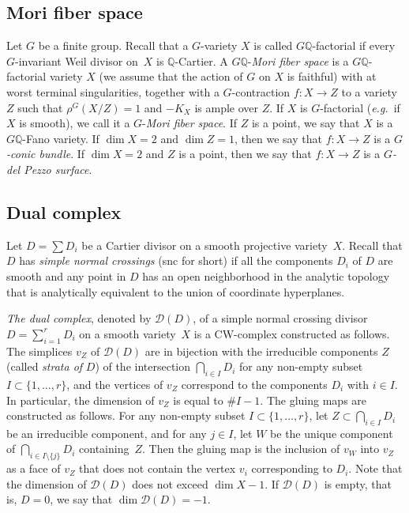 \documentclass[11pt]{amsart}
\numberwithin{equation}{section}
\theoremstyle{definition}
\theoremstyle{remark}
\begin{document}
\subsection{Mori fiber space}
\label{subsec-mfs}
Let $G$ be a finite group.  Recall that a $G$-variety $X$ is called $G\mathbb{Q}$-factorial if every $G$-invariant Weil divisor on~$X$ is $\mathbb{Q}$-Cartier.  A $G\mathbb{Q}$-\emph{Mori fiber space} is a $G\mathbb{Q}$-factorial variety $X$ (we assume that the action of $G$ on $X$ is faithful) with at worst terminal singularities, together with a $G$-contraction $f\colon X\to Z$ to a variety $Z$ such that $\rho^G(X/Z)=1$ and $-K_X$ is ample over $Z$. If $X$ is $G$-factorial (\textit{e.g.}~if $X$ is smooth), we call it a $G$-\emph{Mori fiber space}.  If $Z$ is a point, we say that $X$ is a $G\mathbb{Q}$-Fano variety.  If $\dim X=2$ and $\dim Z=1$, then we say that $f\colon X\to Z$ is a \emph{$G$-conic bundle}.  If $\dim X=2$ and $Z$ is a point, then we say that $f\colon X\to Z$ is a \emph{$G$-del Pezzo surface}.

\subsection{Dual complex}
\label{subsec-dual-complex}
Let $D=\sum D_i$ be a Cartier divisor on a smooth projective variety~$X$. Recall that $D$ has \emph{simple normal crossings} (snc for short) if all the components $D_i$ of $D$ are smooth and any point in $D$ has an open neighborhood in the analytic topology that is analytically equivalent to the union of coordinate hyperplanes.

\emph{The dual complex}, denoted by $\mathcal{D}(D)$, of a simple normal crossing divisor $D=\sum_{i=1}^{r} D_i$ on a smooth variety~$X$ is a CW-complex constructed as follows.  The simplices $v_Z$ of $\mathcal{D}(D)$ are in bijection with the  irreducible components $Z$ (called \emph{strata of} $D$) of the intersection $\bigcap_{i\in I} D_i$ for any non-empty subset $I\subset \{ 1, \ldots, r\}$, and the vertices of $v_Z$ correspond to the components $D_i$ with $i\in I$.  In particular, the dimension of $v_Z$ is equal to $\#I-1$.  The gluing maps are constructed as follows.  For any non-empty subset $I\subset \{ 1, \ldots, r\}$, let $Z\subset \bigcap_{i\in I} D_i$ be an irreducible component, and for any $j\in I$, let $W$ be the unique component of $\bigcap_{i\in I\setminus\{j\}} D_i$ containing~$Z$. Then the gluing map is the inclusion of $v_W$ into $v_Z$ as a face of $v_Z$ that does not contain the vertex $v_i$ corresponding to $D_i$. Note that the dimension of $\mathcal{D}(D)$ does not exceed $\dim X-1$. If $\mathcal{D}(D)$ is empty, that is, $D=0$, we say that $\dim \mathcal{D}(D)=-1$.
\end{document}
